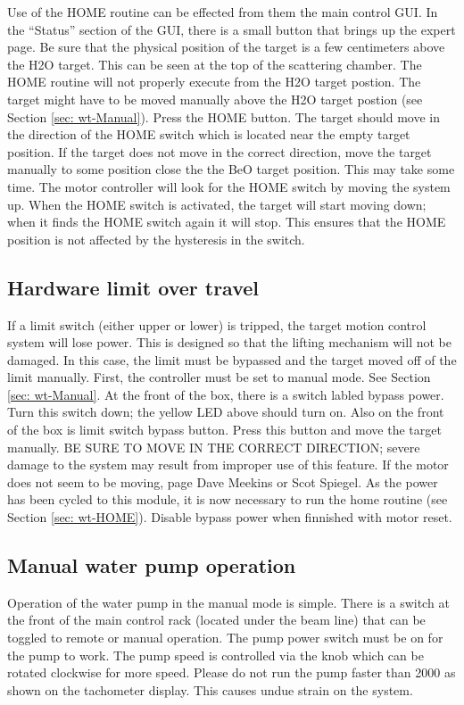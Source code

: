 {Use of the HOME routine can be effected from them the main control
GUI. In the {}``Status'' section of the GUI, there is a small button
that brings up the expert page. Be sure that the physical position
of the target is a few centimeters above the H2O target. This can
be seen at the top of the scattering chamber. The HOME routine will
not properly execute from the H2O target postion. The target might
have to be moved manually above the H2O target postion (see Section
\ref{sec: wt-Manual}). Press the HOME button. The target should move
in the direction of the HOME switch which is located near the empty
target position. If the target does not move in the correct direction,
move the target manually to some position close the the BeO target
position. This may take some time. The motor controller will look
for the HOME switch by moving the system up. When the HOME switch
is activated, the target will start moving down; when it finds the
HOME switch again it will stop. This ensures that the HOME position
is not affected by the hysteresis in the switch.


\subsection{Hardware limit over travel}

If a limit switch (either upper or lower) is tripped, the target motion
control system will lose power. This is designed so that the lifting
mechanism will not be damaged. In this case, the limit must be bypassed
and the target moved off of the limit manually. First, the controller
must be set to manual mode. See Section \ref{sec: wt-Manual}. At the
front of the box, there is a switch labled bypass power. Turn this
switch down; the yellow LED above should turn on. Also on the front
of the box is limit switch bypass button. Press this button and move
the target manually. BE SURE TO MOVE IN THE CORRECT DIRECTION; severe
damage to the system may result from improper use of this feature.
If the motor does not seem to be moving, page Dave Meekins or Scot
Spiegel. As the power has been cycled to this module, it is now necessary
to run the home routine (see Section \ref{sec: wt-HOME}). Disable bypass
power when finnished with motor reset.


\subsection{Manual water pump operation}

Operation of the water pump in the manual mode is simple. There is
a switch at the front of the main control rack (located under the
beam line) that can be toggled to remote or manual operation. The
pump power switch must be on for the pump to work. The pump speed
is controlled via the knob which can be rotated clockwise for more
speed. Please do not run the pump faster than 2000 as shown on the
tachometer display. This causes undue strain on the system.

} %

